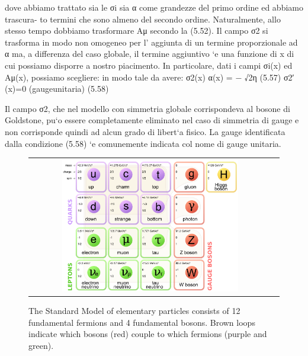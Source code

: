 dove abbiamo trattato sia le σi sia α come grandezze del primo ordine ed abbiamo trascura- to termini che sono almeno del secondo ordine. Naturalmente, allo stesso tempo dobbiamo trasformare Aμ secondo la (5.52).
Il campo σ2 si trasforma in modo non omogeneo per l’ aggiunta di un termine proporzionale ad α ma, a differenza del caso globale, il termine aggiuntivo `e una funzione di x di cui possiamo disporre a nostro piacimento. In particolare, dati i campi σi(x) ed Aμ(x), possiamo scegliere:
  in modo tale da avere:
σ2(x)
α(x) = − √2η (5.57)
σ2′(x)=0 (gaugeunitaria) (5.58)

Il campo σ2, che nel modello con simmetria globale corrispondeva al bosone di Goldstone, pu`o essere completamente eliminato nel caso di simmetria di gauge e non corrisponde quindi ad alcun grado di libert`a fisico. La gauge identificata dalla condizione (5.58) `e comunemente indicata col nome di gauge unitaria.

\begin{figure}[tbh!]
	\centering
	
	\begin{tabular}{cc}
		\includegraphics[width=0.75\textwidth]{theory/pics/SM_particles.png}
	\end{tabular}
	\caption{The Standard Model of elementary particles consists of  12 fundamental fermions and 4 fundamental bosons. Brown loops indicate which bosons (red) couple to which fermions (purple and green).}
	\label{fig:SM_particles}
\end{figure}

